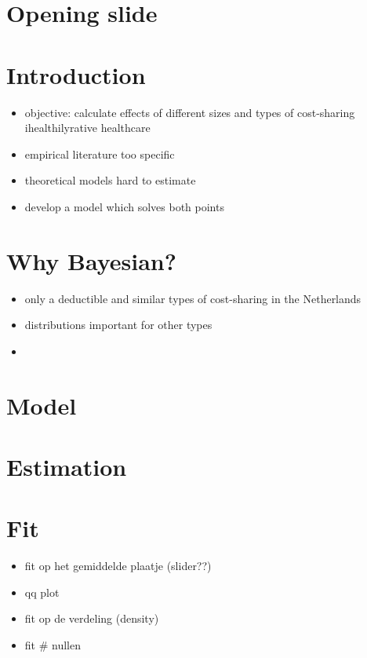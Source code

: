 \documentclass[11pt]{article}
\date{\today}
\title{}
\begin{document}
\tableofcontents

\section{Opening slide}
\label{sec:orgeaa8583}

\section{Introduction}
\label{sec:orgc75d062}

\begin{itemize}
\item objective: calculate effects of different sizes and types of cost-sharing ihealthilyrative healthcare
\item empirical literature too specific
\item theoretical models hard to estimate
\item develop a model which solves both points
\end{itemize}

\section{Why Bayesian?}
\label{sec:orge8c5f7d}

\begin{itemize}
\item only a deductible and similar types of cost-sharing in the Netherlands
\item distributions important for other types
\item <example figure 1>
\end{itemize}

\section{Model}
\label{sec:orgcf0d11b}

\section{Estimation}
\label{sec:orgaed7c15}

\section{Fit}
\label{sec:orgab767e9}

\begin{itemize}
\item fit op het gemiddelde plaatje (slider??)
\item qq plot
\item fit op de verdeling (density)
\item fit \# nullen
\end{itemize}
\end{document}
